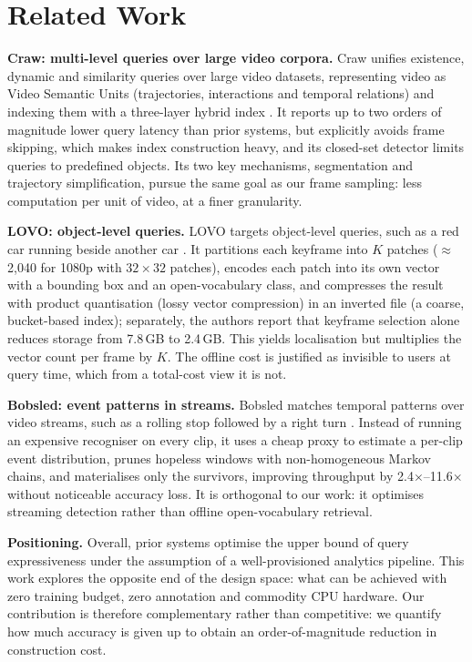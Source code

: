 \documentclass[journal]{IEEEtran}
\begin{document}
\section{Related Work}\label{sec:related}

\noindent\textbf{Craw: multi-level queries over large video corpora.}
Craw unifies existence, dynamic and similarity queries over large video datasets, representing
video as Video Semantic Units (trajectories, interactions and temporal relations) and indexing
them with a three-layer hybrid index \cite{craw2026}. It reports up to two orders of magnitude
lower query latency than prior systems, but explicitly avoids frame skipping, which makes index
construction heavy, and its closed-set detector limits queries to predefined objects. Its two key mechanisms, segmentation and trajectory simplification, pursue the same goal as our frame
sampling: less computation per unit of video, at a finer granularity.

\noindent\textbf{LOVO: object-level queries.}
LOVO targets object-level queries, such as a red car running beside another car \cite{lovo2025}.
It partitions each keyframe into $K$ patches ($\approx$2{,}040 for 1080p with $32\times32$
patches), encodes each patch into its own vector with a bounding box and an open-vocabulary class,
and compresses the result with product quantisation (lossy vector compression) in an inverted file
(a coarse, bucket-based index); separately, the authors report that keyframe selection alone
reduces storage from 7.8\,GB to 2.4\,GB. This yields localisation but multiplies the vector
count per frame by $K$. The
offline cost is justified as invisible to users at query time, which from a total-cost view it is
not.

\noindent\textbf{Bobsled: event patterns in streams.}
Bobsled matches temporal patterns over video streams, such as a rolling stop followed by a right
turn \cite{bobsled2025}. Instead of running an expensive recogniser on every clip, it uses a cheap
proxy to estimate a per-clip event distribution, prunes hopeless windows with non-homogeneous
Markov chains, and materialises only the survivors, improving throughput by
2.4$\times$--11.6$\times$ without noticeable accuracy loss. It is orthogonal to our work: it
optimises streaming detection rather than offline open-vocabulary retrieval.

\noindent\textbf{Positioning.}
Overall, prior systems optimise the upper bound of query expressiveness under the assumption of
a well-provisioned analytics pipeline. This work explores the opposite end of the design space:
what can be achieved with zero training budget, zero annotation and commodity CPU hardware. Our
contribution is therefore complementary rather than competitive: we quantify how much accuracy is
given up to obtain an order-of-magnitude reduction in construction cost.
\end{document}
